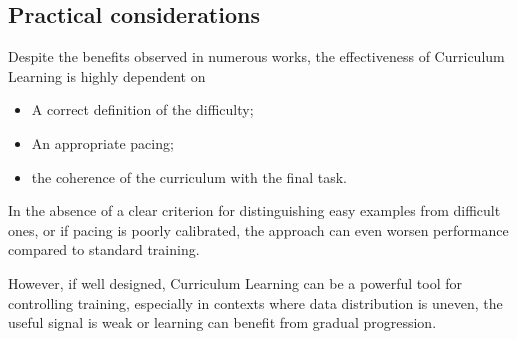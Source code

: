\subsection*{Practical considerations}
Despite the benefits observed in numerous works, the effectiveness of Curriculum Learning is highly dependent on
\begin{itemize}
    \item A correct definition of the difficulty;
    \item An appropriate pacing;
    \item the coherence of the curriculum with the final task.
\end{itemize}

In the absence of a clear criterion for distinguishing easy examples from difficult ones, or if pacing is poorly calibrated, the approach can even worsen performance compared to standard training.

However, if well designed, Curriculum Learning can be a powerful tool for controlling training, especially in contexts where data distribution is uneven, the useful signal is weak or learning can benefit from gradual progression.




